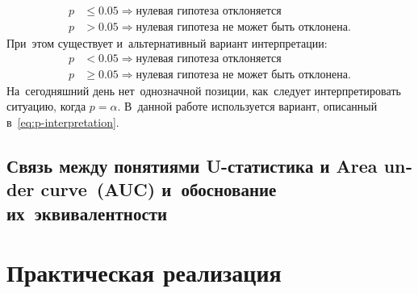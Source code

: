 \documentclass[]{scrartcl}
\begin{document}
\begin{equation}\label{eq:p-interpretation}
	\begin{aligned}
	p &\leq 0.05 \Rightarrow \text{нулевая гипотеза отклоняется}\\
	p &> 0.05 \Rightarrow \text{нулевая гипотеза не может быть отклонена}.
	\end{aligned}
\end{equation}
%
При~этом существует и~альтернативный вариант интерпретации:
%
\begin{equation}\label{eq:p-interpretation-2}
\begin{aligned}
p &< 0.05 \Rightarrow \text{нулевая гипотеза отклоняется}\\
p &\geq 0.05 \Rightarrow \text{нулевая гипотеза не может быть отклонена}.
\end{aligned}
\end{equation}
На~сегодняшний день нет~однозначной позиции, как~следует интерпретировать ситуацию, когда $p = \alpha$. В~данной работе используется вариант, описанный в~\ref{eq:p-interpretation}.

\subsection{Связь между понятиями U-статистика и \foreignlanguage{english}{Area under curve~(AUC)} и~обоснование их~эквивалентности}\label{U-AUC}

\clearpage

\section{Практическая реализация}\label{U-test-practice}
\end{document}

